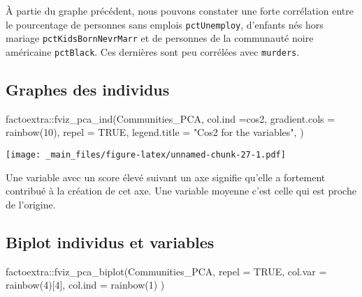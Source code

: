 \documentclass[
]{book}
\newenvironment{Shaded}{\begin{snugshade}}{\end{snugshade}}
\newcommand{\AttributeTok}[1]{\textcolor[rgb]{0.77,0.63,0.00}{#1}}
\newcommand{\ConstantTok}[1]{\textcolor[rgb]{0.00,0.00,0.00}{#1}}
\newcommand{\DecValTok}[1]{\textcolor[rgb]{0.00,0.00,0.81}{#1}}
\newcommand{\FunctionTok}[1]{\textcolor[rgb]{0.00,0.00,0.00}{#1}}
\newcommand{\NormalTok}[1]{#1}
\newcommand{\SpecialCharTok}[1]{\textcolor[rgb]{0.00,0.00,0.00}{#1}}
\newcommand{\StringTok}[1]{\textcolor[rgb]{0.31,0.60,0.02}{#1}}
\begin{document}
À partie du graphe précédent, nous pouvons constater une forte corrélation entre le pourcentage de personnes sans emplois \texttt{pctUnemploy}, d'enfants nés hors mariage \texttt{pctKidsBornNevrMarr} et de personnes de la communauté noire américaine \texttt{pctBlack}. Ces dernières sont peu corrélées avec \texttt{murders}.

\hypertarget{graphes-des-individus}{%
\subsection*{Graphes des individus}\label{graphes-des-individus}}

\begin{Shaded}
\begin{Highlighting}[]
\NormalTok{factoextra}\SpecialCharTok{::}\FunctionTok{fviz\_pca\_ind}\NormalTok{(Communities\_PCA,}
                 \AttributeTok{col.ind =}\StringTok{\textquotesingle{}cos2\textquotesingle{}}\NormalTok{,}
                 \AttributeTok{gradient.cols =} \FunctionTok{rainbow}\NormalTok{(}\DecValTok{10}\NormalTok{),}
                 \AttributeTok{repel =} \ConstantTok{TRUE}\NormalTok{,}
                 \AttributeTok{legend.title =} \StringTok{"Cos2 for the variables"}\NormalTok{,}
\NormalTok{                 )}
\end{Highlighting}
\end{Shaded}

\texttt{[image: \_main\_files/figure-latex/unnamed-chunk-27-1.pdf]}

Une variable avec un score élevé suivant un axe signifie qu'elle a fortement contribué à la création de cet axe. Une variable moyenne c'est celle qui est proche de l'origine.

\hypertarget{biplot-individus-et-variables}{%
\subsection*{Biplot individus et variables}\label{biplot-individus-et-variables}}

\begin{Shaded}
\begin{Highlighting}[]
\NormalTok{factoextra}\SpecialCharTok{::}\FunctionTok{fviz\_pca\_biplot}\NormalTok{(Communities\_PCA, }\AttributeTok{repel =} \ConstantTok{TRUE}\NormalTok{,}
                \AttributeTok{col.var =} \FunctionTok{rainbow}\NormalTok{(}\DecValTok{4}\NormalTok{)[}\DecValTok{4}\NormalTok{], }
                \AttributeTok{col.ind =} \FunctionTok{rainbow}\NormalTok{(}\DecValTok{1}\NormalTok{)}
\NormalTok{                )}
\end{Highlighting}
\end{Shaded}
\end{document}
